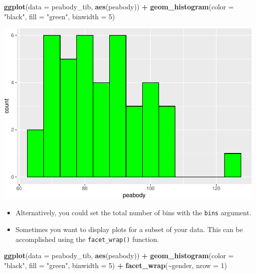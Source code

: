 \documentclass[
]{book}
\newenvironment{Shaded}{\begin{snugshade}}{\end{snugshade}}
\newcommand{\AttributeTok}[1]{\textcolor[rgb]{0.13,0.29,0.53}{#1}}
\newcommand{\DecValTok}[1]{\textcolor[rgb]{0.00,0.00,0.81}{#1}}
\newcommand{\FunctionTok}[1]{\textcolor[rgb]{0.13,0.29,0.53}{\textbf{#1}}}
\newcommand{\NormalTok}[1]{#1}
\newcommand{\SpecialCharTok}[1]{\textcolor[rgb]{0.81,0.36,0.00}{\textbf{#1}}}
\newcommand{\StringTok}[1]{\textcolor[rgb]{0.31,0.60,0.02}{#1}}
\begin{document}
\begin{Shaded}
\begin{Highlighting}[]
\FunctionTok{ggplot}\NormalTok{(}\AttributeTok{data =}\NormalTok{ peabody\_tib, }\FunctionTok{aes}\NormalTok{(peabody)) }\SpecialCharTok{+}
  \FunctionTok{geom\_histogram}\NormalTok{(}\AttributeTok{color =} \StringTok{"black"}\NormalTok{, }\AttributeTok{fill =} \StringTok{"green"}\NormalTok{,}
               \AttributeTok{binwidth =} \DecValTok{5}\NormalTok{)}
\end{Highlighting}
\end{Shaded}

\includegraphics{PSY202A-Modeling-I.Heo_files/figure-latex/unnamed-chunk-77-1.pdf}

\begin{itemize}
\item
  Alternatively, you could set the total number of bins with the \texttt{bins} argument.
\item
  Sometimes you want to display plots for a subset of your data. This can be accomplished using the \texttt{facet\_wrap()} function.
\end{itemize}

\begin{Shaded}
\begin{Highlighting}[]
\FunctionTok{ggplot}\NormalTok{(}\AttributeTok{data =}\NormalTok{ peabody\_tib, }\FunctionTok{aes}\NormalTok{(peabody)) }\SpecialCharTok{+}
  \FunctionTok{geom\_histogram}\NormalTok{(}\AttributeTok{color =} \StringTok{"black"}\NormalTok{, }\AttributeTok{fill =} \StringTok{"green"}\NormalTok{, }
                 \AttributeTok{binwidth =} \DecValTok{5}\NormalTok{) }\SpecialCharTok{+}
  \FunctionTok{facet\_wrap}\NormalTok{(}\SpecialCharTok{\textasciitilde{}}\NormalTok{gender, }\AttributeTok{nrow =} \DecValTok{1}\NormalTok{)}
\end{Highlighting}
\end{Shaded}
\end{document}
